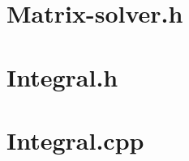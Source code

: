 \documentclass[journal,hidelinks]{IEEEtran}
\begin{document}
\begin{appendices}
\section{Matrix-solver.h}
\label{sec:matrix-solver}

\newpage

\section{Integral.h}
\label{sec:integral-h}

\newpage

\section{Integral.cpp}
\label{sec:integral-cpp}

\newpage

\end{appendices}
\end{document}
